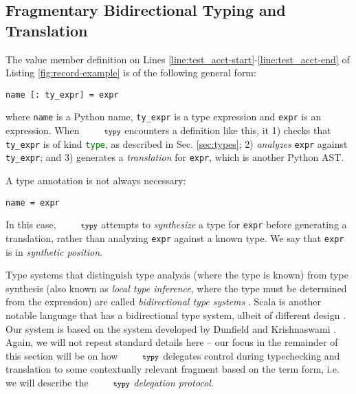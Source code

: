 \documentclass[10pt]{sigplanconf}
\newcommand{\typy}{\texttt{\footnotesize typy}}
\newcommand{\lip}[1]{\lstinline[language=Python,basicstyle=\ttfamily\footnotesize,morekeywords={with},deletendkeywords={tuple,buffer,map}]{#1}}
\newcommand{\li}[1]{\lip{#1}}
\begin{document}
\subsection{Fragmentary Bidirectional Typing and Translation}\label{sec:typechecking-and-translation}
The value member definition on Lines \ref{line:test_acct-start}-\ref{line:test_acct-end} of Listing \ref{fig:record-example} is of the following general form:
\begin{lstlisting}[numbers=none]
name [: ty_expr] = expr
\end{lstlisting}
where \lip{name} is a Python name, \lip{ty_expr} is a type expression and \lip{expr} is an expression. When $\typy$ encounters a definition like this, it 1) checks that \lip{ty_expr} is of kind \li{type}, as described in Sec. \ref{sec:types}; 2) \emph{analyzes} \lip{expr} against \lip{ty_expr}; and 3) generates a \emph{translation} for \lip{expr}, which is another Python AST.%

A type annotation is not always necessary:%
\begin{lstlisting}[numbers=none]
name = expr
\end{lstlisting}
In this case, $\typy$ attempts to \emph{synthesize} a type for \lip{expr} before generating a translation, rather than analyzing \lip{expr} against a known type. We say that \lip{expr} is in \emph{synthetic position}.

Type systems that distinguish type analysis (where the type is known) from type synthesis (also known as \emph{local type inference}, where the type must be determined from the expression) are called \emph{bidirectional type systems} \cite{Pierce:2000:LTI:345099.345100,bidi-tutorial}. Scala is another notable language that has a bidirectional type system, albeit of different design \cite{OdeZenZen01}. Our system is based on the system developed by Dunfield and Krishnaswami \cite{conf/icfp/DunfieldK13}. Again, we will not repeat standard details here -- our focus in the remainder of this section will be on how $\typy$ delegates control during typechecking and translation to some contextually relevant fragment based on the term form, i.e. we will describe the $\typy$ \emph{delegation protocol}. %
\end{document}
